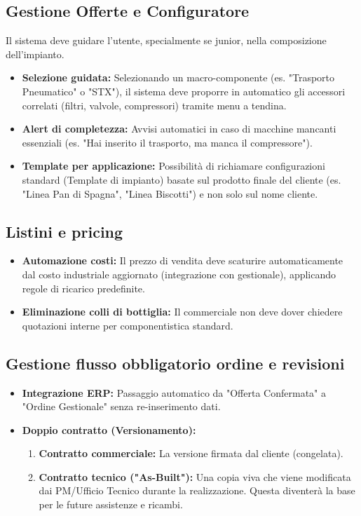 \documentclass[12pt, a4paper]{article} %
\begin{document}
\subsection{Gestione Offerte e Configuratore}
Il sistema deve guidare l'utente, specialmente se junior, nella composizione
dell'impianto.
\begin{itemize}
    \item \textbf{Selezione guidata:} Selezionando un macro-componente (es. "Trasporto Pneumatico" o "STX"),
          il sistema deve proporre in automatico gli accessori correlati (filtri, valvole, compressori) tramite menu a tendina.
    \item \textbf{Alert di completezza:} Avvisi automatici in caso di macchine mancanti essenziali
          (es. "Hai inserito il trasporto, ma manca il compressore").
    \item \textbf{Template per applicazione:} Possibilità di richiamare configurazioni standard (Template di impianto)
          basate sul prodotto finale del cliente (es. "Linea Pan di Spagna", "Linea Biscotti") e non solo sul nome cliente.
\end{itemize}

\subsection{Listini e pricing}
\begin{itemize}
    \item \textbf{Automazione costi:} Il prezzo di vendita deve scaturire automaticamente dal costo industriale aggiornato (integrazione con gestionale), applicando regole di ricarico predefinite.
    \item \textbf{Eliminazione colli di bottiglia:} Il commerciale non deve dover chiedere quotazioni interne per componentistica standard.
\end{itemize}

\subsection{Gestione flusso obbligatorio ordine e revisioni}
\begin{itemize}
    \item \textbf{Integrazione ERP:} Passaggio automatico da "Offerta Confermata" a "Ordine Gestionale" senza re-inserimento dati.
    \item \textbf{Doppio contratto (Versionamento):}
          \begin{enumerate}
              \item \textbf{Contratto commerciale:} La versione firmata dal cliente (congelata).
              \item \textbf{Contratto tecnico ("As-Built"):} Una copia viva che viene modificata dai PM/Ufficio Tecnico durante la realizzazione.
                    Questa diventerà la base per le future assistenze e ricambi.
          \end{enumerate}
\end{itemize} 
\end{document}
